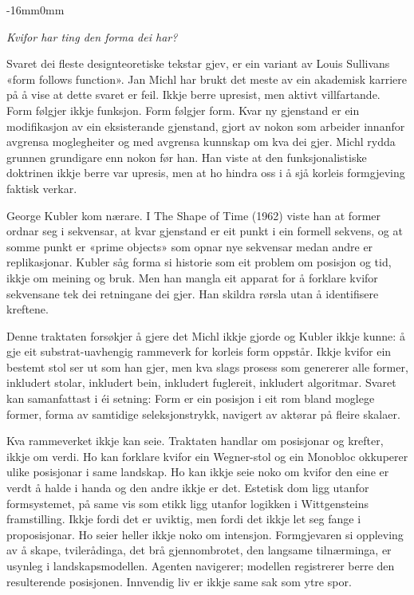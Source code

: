 \documentclass[10pt,oneside]{book}
\newenvironment{overgang}{%
  \par\addvspace{12pt}%
  \begingroup\itshape\noindent
}{%
  \endgroup\par\addvspace{12pt}%
}
\newenvironment{foreordbody}{%
  \begingroup\small\setlength{\parskip}{0.5pt plus 0.2pt}%
  \linespread{0.90}\selectfont
}{%
  \endgroup
}
\newenvironment{widebody}{%
  \begin{adjustwidth}{-16mm}{0mm}%
}{%
  \end{adjustwidth}%
}
\begin{document}
\begin{widebody}
\begin{foreordbody}
\begin{overgang}Kvifor har ting den forma dei har?\end{overgang}
Svaret dei fleste designteoretiske tekstar gjev, er ein variant av Louis Sullivans «form follows function». Jan Michl har brukt det meste av ein akademisk karriere på å vise at dette svaret er feil. Ikkje berre upresist, men aktivt villfartande. Form følgjer ikkje funksjon. Form følgjer form. Kvar ny gjenstand er ein modifikasjon av ein eksisterande gjenstand, gjort av nokon som arbeider innanfor avgrensa moglegheiter og med avgrensa kunnskap om kva dei gjer. Michl rydda grunnen grundigare enn nokon før han. Han viste at den funksjonalistiske doktrinen ikkje berre var upresis, men at ho hindra oss i å sjå korleis formgjeving faktisk verkar.

George Kubler kom nærare. I The Shape of Time (1962) viste han at former ordnar seg i sekvensar, at kvar gjenstand er eit punkt i ein formell sekvens, og at somme punkt er «prime objects» som opnar nye sekvensar medan andre er replikasjonar. Kubler såg forma si historie som eit problem om posisjon og tid, ikkje om meining og bruk. Men han mangla eit apparat for å forklare kvifor sekvensane tek dei retningane dei gjer. Han skildra rørsla utan å identifisere kreftene.

Denne traktaten forsøkjer å gjere det Michl ikkje gjorde og Kubler ikkje kunne: å gje eit substrat-uavhengig rammeverk for korleis form oppstår. Ikkje kvifor ein bestemt stol ser ut som han gjer, men kva slags prosess som genererer alle former, inkludert stolar, inkludert bein, inkludert fuglereit, inkludert algoritmar. Svaret kan samanfattast i éi setning: Form er ein posisjon i eit rom bland moglege former, forma av samtidige seleksjonstrykk, navigert av aktørar på fleire skalaer.

Kva rammeverket ikkje kan seie. Traktaten handlar om posisjonar og krefter, ikkje om verdi. Ho kan forklare kvifor ein Wegner-stol og ein Monobloc okkuperer ulike posisjonar i same landskap. Ho kan ikkje seie noko om kvifor den eine er verdt å halde i handa og den andre ikkje er det. Estetisk dom ligg utanfor formsystemet, på same vis som etikk ligg utanfor logikken i Wittgensteins framstilling. Ikkje fordi det er uviktig, men fordi det ikkje let seg fange i proposisjonar. Ho seier heller ikkje noko om intensjon. Formgjevaren si oppleving av å skape, tvilerådinga, det brå gjennombrotet, den langsame tilnærminga, er usynleg i landskapsmodellen. Agenten navigerer; modellen registrerer berre den resulterende posisjonen. Innvendig liv er ikkje same sak som ytre spor.


\end{foreordbody}
\end{widebody}
\end{document}
